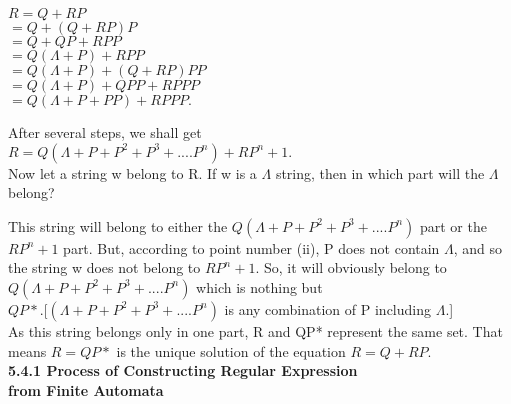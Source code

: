 \documentclass[9pt]{beamer}
\begin{document}
\begin{frame}
\hspace*{3.1cm} $R = Q + RP$ \\
\hspace*{3.5cm} $= Q + (Q + RP)P$ \\
\hspace*{3.5cm} $= Q + QP + RPP$ \\
\hspace*{3.5cm} $= Q(\Lambda + P) + RPP$ \\
\hspace*{3.5cm} $= Q(\Lambda + P) + (Q + RP)PP$ \\
\hspace*{3.5cm} $= Q(\Lambda + P) + QPP + RPPP$ \\
\hspace*{3.5cm} $= Q(\Lambda + P + PP) + RPPP.$ \\
\vspace*{0.1cm}

After several steps, we shall get\\

\vspace*{0.1cm}
\hspace*{3cm} $R = Q(\Lambda + P + P^2 + P^3 + .... P^n) + RP^n + 1.$ \\

\vspace*{0.1cm}
\hspace*{0.5cm} Now let a string w belong to R. If w is a $\Lambda$ string, then in which part will the $\Lambda$ belong?\\

\end{frame}

\begin{frame}
\hspace*{0.5cm} This string will belong to either the $Q(\Lambda + P + P^2 + P^3 + .... P^n)$ part or the $RP^n + 1$ part. But, according
to point number (ii), P does not contain $\Lambda$, and so the string w does not belong to $RP^n + 1$. So, it will
obviously belong to $Q(\Lambda + P + P^2 + P^3 + .... P^n)$ which is nothing but $QP*. [(\Lambda + P + P^2 + P^3 + .... P^n)$ is
any combination of P including $\Lambda$.]\\

\hspace*{0.5cm} As this string belongs only in one part, R and QP* represent the same set. That means $R = QP*$ is the
unique solution of the equation $R = Q + RP.$\\

\vspace*{0.5cm}
\large{
\textbf{5.4.1 Process of Constructing Regular Expression\\
\hspace*{0.7cm} from Finite Automata}\\
}

\vspace*{0.2cm}
\end{frame}
\end{document}

